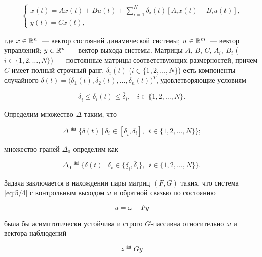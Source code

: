 \begin{equation}
\label{eq:5/4}
\left\{ \begin{array}{l}
\dot{x}(t) = Ax(t) + Bu(t) + \sum\limits_{i=1}^N \delta_i(t)[A_ix(t) + B_iu(t)]\mbox{,} \\
y(t) = Cx(t)\mbox{,}
\end{array} \right.
\end{equation}

где $x \in \mathbb{R}^{n}$~--- вектор состояний динамической системы; $u \in \mathbb{R}^{m}$~--- вектор управлений; $y \in \mathbb{R}^{p}$~--- вектор выхода системы. Матрицы $A$, $B$, $C$, $A_i$, $B_i$ ($i \in \{ 1,2, \ldots, N \}$)~--- постоянные матрицы соответствующих размерностей, причем $C$ имеет полный строчный ранг. $\delta_i(t)$ ($i \in \{ 1,2, \ldots, N \}$) есть компоненты случайного $\delta(t) = \big(\delta_1(t), \delta_2(t), \ldots, \delta_n(t)\big)^T$, удовлетворяющие условиям

\begin{equation}
\label{eq:5/5}
\underline{\delta}_i \leqslant \delta_i(t) \leqslant \overline{\delta}_i{,}~~~~i \in \{ 1,2, \ldots, N \}\mbox{.}
\end{equation}

Определим множество $\Delta$ таким, что

\begin{equation}
\label{eq:5/6}
\Delta \eqdef \big\{ \delta(t)~|~ \delta_i \in [ \underline{\delta}_i ,\overline{\delta}_i ]{,}~~i \in \{ 1,2, \ldots, N \} \big\}\mbox{;}
\end{equation}

множество граней $\Delta_0$ определим как

\begin{equation}
\label{eq:5/7}
\Delta_0 \eqdef \big\{ \delta(t)~|~ \delta_i \in \{ \underline{\delta}_i ,\overline{\delta}_i \}{,}~~i \in \{ 1,2, \ldots, N \} \big\}\mbox{.}
\end{equation}

Задача заключается в нахождении пары матриц $(F,G)$ таких, что система \vref{eq:5/4} с контрольным выходом $\omega$ и обратной связью по состоянию

\begin{equation}
\label{eq:5/8}
u = \omega - Fy
\end{equation}

была бы асимптотически устойчива и строго $G$-пассивна относительно $\omega$ и вектора наблюдений

\begin{equation}
\label{eq:5/9}
z \eqdef Gy
\end{equation}

